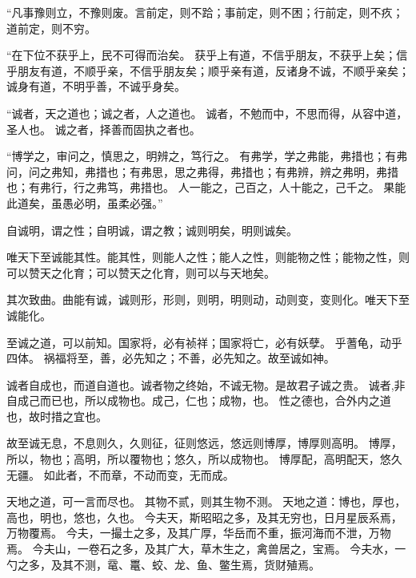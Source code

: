 \documentclass[twoside,openany]{book}
\begin{document}
\begin{pinyinscope}
“凡事豫则立，不豫则废。言前定，则不跲；事前定，则不困；行前定，则不疚；道前定，则不穷。

“在下位不获乎上，民不可得而治矣。
获乎上有道，不信乎朋友，不获乎上矣；信乎朋友有道，不顺乎亲，不信乎朋友矣；顺乎亲有道，反诸身不诚，不顺乎亲矣；诚身有道，不明乎善，不诚乎身矣。

“诚者，天之道也；诚之者，人之道也。
诚者，不勉而中，不思而得，从容中道，圣人也。
诚之者，择善而固执之者也。

“博学之，审问之，慎思之，明辨之，笃行之。
有弗学，学之弗能，弗措也；有弗问，问之弗知，弗措也；有弗思，思之弗得，弗措也；有弗辨，辨之弗明，弗措也；有弗行，行之弗笃，弗措也。
人一能之，己百之，人十能之，己千之。
果能此道矣，虽愚必明，虽柔必强。”

自诚明，谓之性；自明诚，谓之教；诚则明矣，明则诚矣。

唯天下至诚能其性。能其性，则能人之性；能人之性，则能物之性；能物之性，则可以赞天之化育；可以赞天之化育，则可以与天地矣。

其次致曲。曲能有诚，诚则形，形则，则明，明则动，动则变，变则化。唯天下至诚能化。

至诚之道，可以前知。国家将，必有祯祥；国家将亡，必有妖孽。
乎蓍龟，动乎四体。
祸福将至，善，必先知之；不善，必先知之。故至诚如神。

诚者自成也，而道自道也。诚者物之终始，不诚无物。是故君子诚之贵。
诚者,非自成己而已也，所以成物也。成己，仁也；成物，也。
性之德也，合外内之道也，故时措之宜也。

故至诚无息，不息则久，久则征，征则悠远，悠远则博厚，博厚则高明。
博厚，所以，物也；高明，所以覆物也；悠久，所以成物也。
博厚配，高明配天，悠久无疆。
如此者，不而章，不动而变，无而成。

天地之道，可一言而尽也。
其物不贰，则其生物不测。
天地之道：博也，厚也，高也，明也，悠也，久也。
今夫天，斯昭昭之多，及其无穷也，日月星辰系焉，万物覆焉。
今夫，一撮土之多，及其广厚，华岳而不重，振河海而不泄，万物焉。
今夫山，一卷石之多，及其广大，草木生之，禽兽居之，宝焉。
今夫水，一勺之多，及其不测，鼋、鼍、蛟、龙、鱼、鳖生焉，货财殖焉。


\end{pinyinscope}
\end{document}
